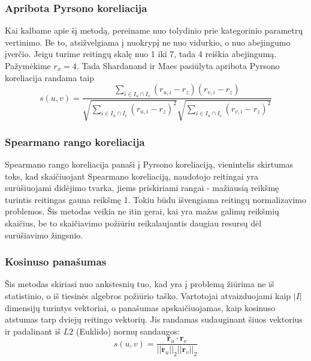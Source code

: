\documentclass{VUMIFInfMagistrinis}
\begin{document}
\subsubsection{Apribota Pyrsono koreliacija}
Kai kalbame apie šį metodą, pereiname nuo tolydinio prie kategorinio parametrų vertinimo. Be to, atsižvelgiama į nuokrypį ne nuo vidurkio, o nuo abejingumo įverčio. Jeigu turime reitingų skalę nuo 1 iki 7, tada 4 reiškia abejingumą. Pažymėkime $r_x = 4$. Tada Shardanand ir Maes pasiūlyta apribota Pyrsono koreliacija randama taip
\begin{equation}
s(u,v) = \frac{\sum \limits_{i\in I_u \cap I_v }(r_{u,i}-r_z)(r_{v,i}-r_z)}{\sqrt{\sum\limits_{i \in I_u \cap I_v }(r_{u,i} - r_z)^2}\sqrt{\sum\limits_{i \in I_u \cap I_v }(r_{v,i} - r_z)^2}}
\end{equation}
\subsubsection{Spearmano rango koreliacija}
Spearmano rango koreliacija panaši į Pyrsono koreliaciją, vienintelis skirtumas toks, kad skaičiuojant Spearmano koreliaciją, naudotojo reitingai yra surūšiuojami didėjimo tvarka, jiems priskiriami rangai - mažiausią reikšmę turintis reitingas gauna reikšmę 1. Tokiu būdu išvengiama reitingų normalizavimo problemos. Šis metodas veikia ne itin gerai, kai yra mažas galimų reikšmių skaičius, be to skaičiavimo požiūriu reikalaujantis daugiau resursų dėl surūšiavimo žingsnio.
\subsubsection{Kosinuso panašumas}
Šis metodas skiriasi nuo ankstesnių tuo, kad yra į problemą žiūrima ne iš statistinio, o iš tiesinės algebros požiūrio taško. Vartotojai atvaizduojami kaip $|I|$ dimensijų turintys vektoriai, o panašumas apskaičiuojamas, kaip kosinuso atstumas tarp dviejų reitingo vektorių. Jis randamas sudauginant šiuos vektorius ir padalinant iš $L2$ (Euklido) normų sandaugos:
\begin{equation}
s(u,v) = \frac{\boldsymbol{r}_u \cdot \boldsymbol{r}_v}{||\boldsymbol{r}_u||_2 ||\boldsymbol{r}_v||_2}
\end{equation}
\end{document}
